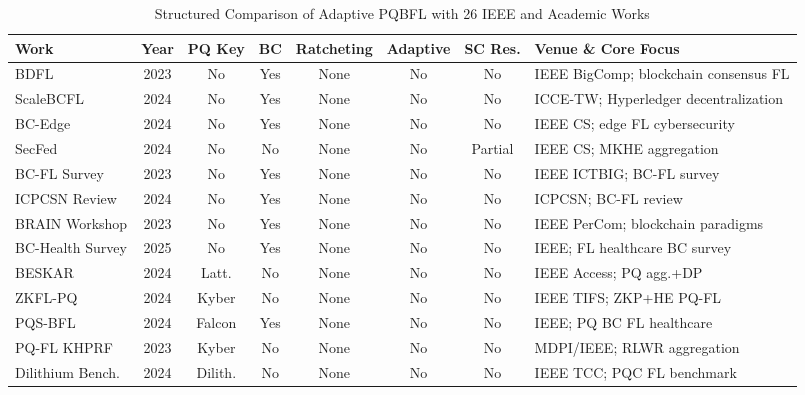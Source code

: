 \documentclass[journal, 10pt, twocolumn]{IEEEtran}
\begin{document}
\begin{table}[htbp]
\centering
\caption{Structured Comparison of Adaptive PQBFL with 26 IEEE and Academic Works}
\label{tab:lit_survey}
\begin{tabularx}{\textwidth}{l c c c c c c X}
\toprule
\textbf{Work} & \textbf{Year} & \textbf{PQ Key} & \textbf{BC} & \textbf{Ratcheting} & \textbf{Adaptive} & \textbf{SC Res.} & \textbf{Venue \& Core Focus} \\
\midrule
BDFL \cite{bdfll23}                    & 2023 & No          & Yes & None         & No  & No      & IEEE BigComp; blockchain consensus FL \\
ScaleBCFL \cite{scalebcfl}             & 2024 & No          & Yes & None         & No  & No      & ICCE-TW; Hyperledger decentralization \\
BC-Edge \cite{bc_edge}                 & 2024 & No          & Yes & None         & No  & No      & IEEE CS; edge FL cybersecurity \\
SecFed \cite{secfed}                   & 2024 & No          & No  & None         & No  & Partial & IEEE CS; MKHE aggregation \\
BC-FL Survey \cite{bcfl_survey}        & 2023 & No          & Yes & None         & No  & No      & IEEE ICTBIG; BC-FL survey \\
ICPCSN Review \cite{icpcsn24}          & 2024 & No          & Yes & None         & No  & No      & ICPCSN; BC-FL review \\
BRAIN Workshop \cite{braint}           & 2023 & No          & Yes & None         & No  & No      & IEEE PerCom; blockchain paradigms \\
BC-Health Survey \cite{bc_healthcare_survey} & 2025 & No   & Yes & None         & No  & No      & IEEE; FL healthcare BC survey \\
BESKAR \cite{beskar}                   & 2024 & Latt.       & No  & None         & No  & No      & IEEE Access; PQ agg.+DP \\
ZKFL-PQ \cite{zkflpq}                  & 2024 & Kyber       & No  & None         & No  & No      & IEEE TIFS; ZKP+HE PQ-FL \\
PQS-BFL \cite{pqsbfl}                  & 2024 & Falcon      & Yes & None         & No  & No      & IEEE; PQ BC FL healthcare \\
PQ-FL KHPRF \cite{pqfl_mdpi}           & 2023 & Kyber       & No  & None         & No  & No      & MDPI/IEEE; RLWR aggregation \\
Dilithium Bench. \cite{comp_1}         & 2024 & Dilith.     & No  & None         & No  & No      & IEEE TCC; PQC FL benchmark \\

\end{tabularx}
\end{table}
\end{document}
